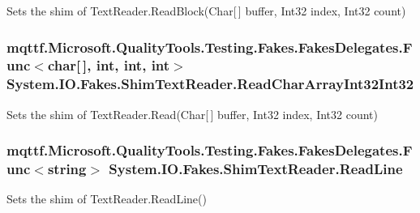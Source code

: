Sets the shim of Text\-Reader.\-Read\-Block(\-Char\mbox{[}$\,$\mbox{]} buffer, Int32 index, Int32 count)

\hypertarget{class_system_1_1_i_o_1_1_fakes_1_1_shim_text_reader_a2fa5ba0fba28b5c2f6e13a512d435965}{
\subsubsection[{Read\-Char\-Array\-Int32\-Int32}]{\setlength{\rightskip}{0pt plus 5cm}mqttf.\-Microsoft.\-Quality\-Tools.\-Testing.\-Fakes.\-Fakes\-Delegates.\-Func$<$char\mbox{[}$\,$\mbox{]}, int, int, int$>$ System.\-I\-O.\-Fakes.\-Shim\-Text\-Reader.\-Read\-Char\-Array\-Int32\-Int32\hspace{0.3cm}{\ttfamily [set]}}}\label{class_system_1_1_i_o_1_1_fakes_1_1_shim_text_reader_a2fa5ba0fba28b5c2f6e13a512d435965}


Sets the shim of Text\-Reader.\-Read(\-Char\mbox{[}$\,$\mbox{]} buffer, Int32 index, Int32 count)

\hypertarget{class_system_1_1_i_o_1_1_fakes_1_1_shim_text_reader_aefa1dddaef8a14e287eb399f0ebf0fa0}{
\subsubsection[{Read\-Line}]{\setlength{\rightskip}{0pt plus 5cm}mqttf.\-Microsoft.\-Quality\-Tools.\-Testing.\-Fakes.\-Fakes\-Delegates.\-Func$<$string$>$ System.\-I\-O.\-Fakes.\-Shim\-Text\-Reader.\-Read\-Line\hspace{0.3cm}{\ttfamily [set]}}}\label{class_system_1_1_i_o_1_1_fakes_1_1_shim_text_reader_aefa1dddaef8a14e287eb399f0ebf0fa0}


Sets the shim of Text\-Reader.\-Read\-Line()

